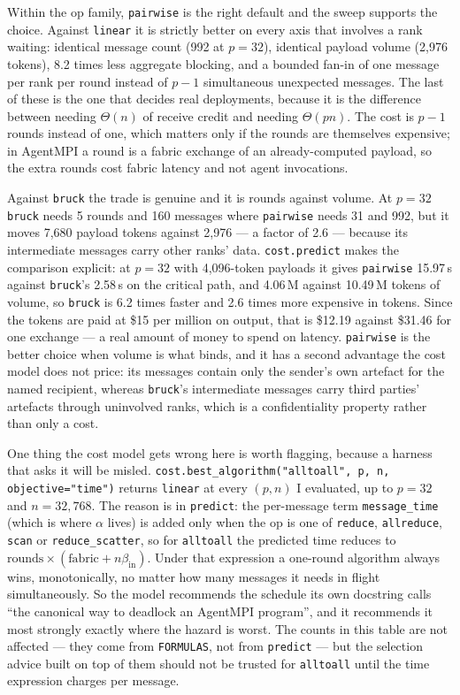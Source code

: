\documentclass[11pt]{article}
\begin{document}
Within the op family, \texttt{pairwise} is the right default and the sweep supports the
choice. Against \texttt{linear} it is strictly better on every axis that involves a rank
waiting: identical message count (992 at $p=32$), identical payload volume (2,976 tokens),
8.2 times less aggregate blocking, and a bounded fan-in of one message per rank per round
instead of $p-1$ simultaneous unexpected messages. The last of these is the one that decides
real deployments, because it is the difference between needing $\Theta(n)$ of receive credit
and needing $\Theta(pn)$. The cost is $p-1$ rounds instead of one, which matters only if the
rounds are themselves expensive; in AgentMPI a round is a fabric exchange of an
already-computed payload, so the extra rounds cost fabric latency and not agent invocations.

Against \texttt{bruck} the trade is genuine and it is rounds against volume. At $p=32$
\texttt{bruck} needs 5 rounds and 160 messages where \texttt{pairwise} needs 31 and 992, but it
moves 7,680 payload tokens against 2,976 --- a factor of 2.6 --- because its intermediate
messages carry other ranks' data. \texttt{cost.predict} makes the comparison explicit: at
$p=32$ with 4,096-token payloads it gives \texttt{pairwise} 15.97\,s against \texttt{bruck}'s
2.58\,s on the critical path, and 4.06\,M against 10.49\,M tokens of volume, so \texttt{bruck}
is 6.2 times faster and 2.6 times more expensive in tokens. Since the tokens are paid at
\$15 per million on output, that is \$12.19 against \$31.46 for one exchange --- a real amount
of money to spend on latency. \texttt{pairwise} is the better choice when volume is what
binds, and it has a second advantage the cost model does not price: its messages contain only
the sender's own artefact for the named recipient, whereas \texttt{bruck}'s intermediate
messages carry third parties' artefacts through uninvolved ranks, which is a confidentiality
property rather than only a cost.

One thing the cost model gets wrong here is worth flagging, because a harness that asks it
will be misled. \texttt{cost.best\_algorithm("alltoall", p, n, objective="time")} returns
\texttt{linear} at every $(p,n)$ I evaluated, up to $p=32$ and $n=32{,}768$. The reason is in
\texttt{predict}: the per-message term \texttt{message\_time} (which is where $\alpha$ lives)
is added only when the op is one of \texttt{reduce}, \texttt{allreduce}, \texttt{scan} or
\texttt{reduce\_scatter}, so for \texttt{alltoall} the predicted time reduces to
$\text{rounds} \times (\text{fabric} + n\beta_\text{in})$. Under that expression a one-round
algorithm always wins, monotonically, no matter how many messages it needs in flight
simultaneously. So the model recommends the schedule its own docstring calls ``the canonical
way to deadlock an AgentMPI program'', and it recommends it most strongly exactly where the
hazard is worst. The counts in this table are not affected --- they come from
\texttt{FORMULAS}, not from \texttt{predict} --- but the selection advice built on top of them
should not be trusted for \texttt{alltoall} until the time expression charges per message.
\end{document}
